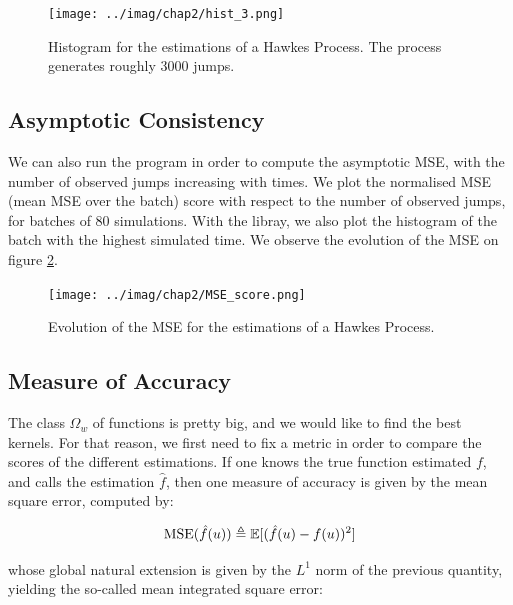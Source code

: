 \documentclass[11pt]{book}
\begin{document}
\begin{figure}
\centering
\texttt{[image: ../imag/chap2/hist\_3.png]}
\caption{Histogram for the estimations of a Hawkes Process. The process generates roughly 3000 jumps.}
\label{fig:hist_1_nu}
\end{figure}


\subsection{Asymptotic Consistency}

We can also run the program in order to compute the asymptotic MSE, with the number of observed jumps increasing with times. We plot the normalised MSE (mean MSE over the batch) score with respect to the number of observed jumps, for batches of 80 simulations. With the libray, we also plot the histogram of the batch with the highest simulated time. We observe the evolution of the MSE on figure \ref{fig:MSE_1}.





\begin{figure}
\centering
\texttt{[image: ../imag/chap2/MSE\_score.png]}
\caption{Evolution of the MSE for the estimations of a Hawkes Process.}
\label{fig:MSE_1}
\end{figure}











\subsection{Measure of Accuracy}
The class $ \Omega_w $ of functions is pretty big, and we would like to find the best kernels. For that reason, we first need to fix a metric in order to compare the scores of the different estimations. If one knows the true function estimated $f$, and calls the estimation $\hat{f}$, then one measure of accuracy is given by the mean square error, computed by: 

\begin{equation}
\operatorname{MSE} ( \hat{f}(u) ) \triangleq  \mathbb E [ ( \hat{f}(u) - f(u) )^2 ]
\end{equation}

whose global natural extension is given by the $L^1$ norm of the previous quantity, yielding the so-called mean integrated square error:
\end{document}
